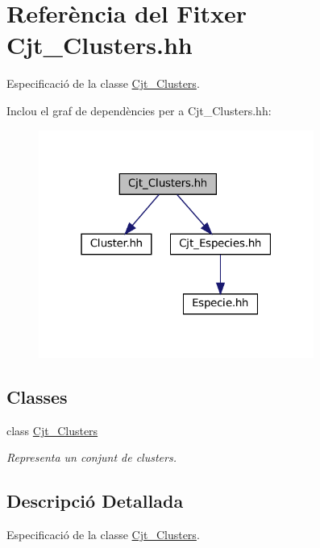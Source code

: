 \hypertarget{_cjt___clusters_8hh}{}\section{Referència del Fitxer Cjt\+\_\+\+Clusters.\+hh}
\label{_cjt___clusters_8hh}


Especificació de la classe \hyperlink{class_cjt___clusters}{Cjt\+\_\+\+Clusters}.  


Inclou el graf de dependències per a Cjt\+\_\+\+Clusters.\+hh\+:
\nopagebreak
\begin{figure}[H]
\begin{center}
\leavevmode
\includegraphics[width=256pt]{_cjt___clusters_8hh__incl}
\end{center}
\end{figure}
\subsection*{Classes}
\begin{DoxyCompactItemize}
\item 
class \hyperlink{class_cjt___clusters}{Cjt\+\_\+\+Clusters}
\begin{DoxyCompactList}\small\item\em Representa un conjunt de clusters. \end{DoxyCompactList}\end{DoxyCompactItemize}


\subsection{Descripció Detallada}
Especificació de la classe \hyperlink{class_cjt___clusters}{Cjt\+\_\+\+Clusters}. 

